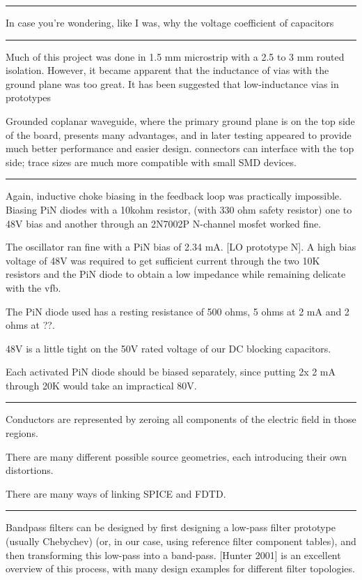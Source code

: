 \documentclass[paper.tex]{subfiles}
\begin{document}
\rule{\linewidth}{0.2pt}

In case you're wondering, like I was, why the voltage coefficient of capacitors 

\rule{\linewidth}{0.2pt}

Much of this project was done in 1.5 mm microstrip with a 2.5 to 3 mm routed isolation. However, it became apparent that the inductance of vias with the ground plane was too great. It has been suggested that low-inductance vias in prototypes \cite{Microwavee}

Grounded coplanar waveguide, where the primary ground plane is on the top side of the board, presents many advantages, and in later testing appeared to provide much better performance and easier design. connectors can interface with the top side; trace sizes are much more compatible with small SMD devices.



\rule{\linewidth}{0.2pt}

Again, inductive choke biasing in the feedback loop was practically impossible. Biasing PiN diodes with a 10kohm resistor, (with 330 ohm safety resistor) one to 48V bias and another through an 2N7002P N-channel mosfet worked fine. 

The oscillator ran fine with a PiN bias of 2.34 mA. [LO prototype N]. A high bias voltage of 48V was required to get sufficient current through the two 10K resistors and the PiN diode to obtain a low impedance while remaining delicate with the vfb.

The PiN diode used has a resting resistance of 500 ohms, 5 ohms at 2 mA and 2 ohms at ??. 

48V is a little tight on the 50V rated voltage of our DC blocking capacitors.

Each activated PiN diode should be biased separately, since putting 2x 2 mA through 20K would take an impractical 80V.

\rule{\linewidth}{0.2pt}

Conductors are represented by zeroing all components of the electric field in those regions. 

There are many different possible source geometries, each introducing their own distortions.

There are many ways of linking SPICE and FDTD. 

\rule{\linewidth}{0.2pt}

Bandpass filters can be designed by first designing a low-pass filter prototype (usually Chebychev) (or, in our case, using reference filter component tables), and then transforming this low-pass into a band-pass. [Hunter 2001] is an excellent overview of this process, with many design examples for different filter topologies. 
\end{document}
